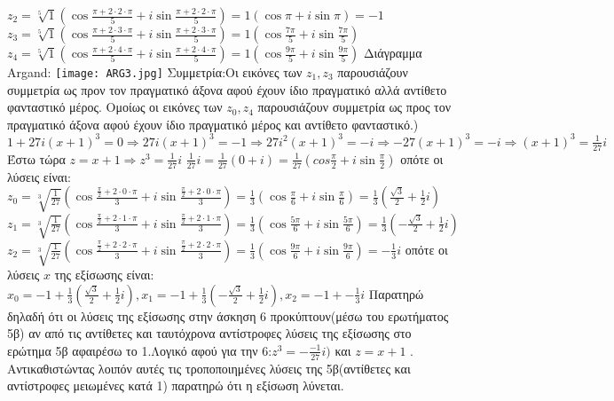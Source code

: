 \documentclass{article}
\begin{document}
$z_2=\sqrt[5]{1}(\cos{\frac{\pi+2\cdot2\cdot\pi}{5}}+i\sin{\frac{\pi+2\cdot2\cdot\pi}{5}})=1(\cos\pi+i\sin\pi)=-1$ \newline
$z_3=\sqrt[5]{1}(\cos{\frac{\pi+2\cdot3\cdot\pi}{5}}+i\sin{\frac{\pi+2\cdot3\cdot\pi}{5}})=1(\cos{\frac{7\pi}{5}}+i\sin{\frac{7\pi}{5}})$ \newline
$z_4=\sqrt[5]{1}(\cos{\frac{\pi+2\cdot4\cdot\pi}{5}}+i\sin{\frac{\pi+2\cdot4\cdot\pi}{5}})=1(\cos{\frac{9\pi}{5}}+i\sin{\frac{9\pi}{5}})$
Διάγραμμα Argand:\newline
\texttt{[image: ARG3.jpg]} \newline
Συμμετρία:Οι εικόνες των $z_1,z_3$ παρουσιάζουν συμμετρία ως προν τον πραγματικό άξονα αφού έχουν ίδιο πραγματικό αλλά αντίθετο φανταστικό μέρος. Ομοίως οι εικόνες των $z_0,z_4$ παρουσιάζουν συμμετρία ως προς τον πραγματικό άξονα αφού έχουν ίδιο πραγματικό μέρος και αντίθετο φανταστικό.)
$1+27i{(x+1)}^3=0 \Rightarrow 27i{(x+1)}^3=-1 \Rightarrow 27i^2{(x+1)}^3=-i \Rightarrow -27{(x+1)}^3=-i \Rightarrow {(x+1)}^3=\frac{1}{27}i $ \newline
Έστω τώρα $z=x+1 \Rightarrow z^3=\frac{1}{27}i$ \newline
$\frac{1}{27}i=\frac{1}{27}(0+i)=\frac{1}{27}(cos{\frac{\pi}{2}}+i\sin{\frac{\pi}{2}})$ οπότε οι λύσεις είναι:\newline
$z_0=\sqrt[3]{\frac{1}{27}}(\cos{\frac{\frac{\pi}{2}+2\cdot0\cdot\pi}{3}}+i\sin{\frac{\frac{\pi}{2}+2\cdot0\cdot\pi}{3}})=\frac{1}{3}(\cos{\frac{\pi}{6}}+i\sin{\frac{\pi}{6}})=\frac{1}{3}(\frac{\sqrt3}{2}+\frac{1}{2}i)$\newline
$z_1=\sqrt[3]{\frac{1}{27}}(\cos{\frac{\frac{\pi}{2}+2\cdot1\cdot\pi}{3}}+i\sin{\frac{\frac{\pi}{2}+2\cdot1\cdot\pi}{3}})=\frac{1}{3}(\cos{\frac{5\pi}{6}}+i\sin{\frac{5\pi}{6}})=\frac{1}{3}(-\frac{\sqrt3}{2}+\frac{1}{2}i)$ \newline
$z_2=\sqrt[3]{\frac{1}{27}}(\cos{\frac{\frac{\pi}{2}+2\cdot2\cdot\pi}{3}}+i\sin{\frac{\frac{\pi}{2}+2\cdot2\cdot\pi}{3}})=\frac{1}{3}(\cos{\frac{9\pi}{6}}+i\sin{\frac{9\pi}{6}})=-\frac{1}{3}i$ οπότε οι λύσεις $x$ της εξίσωσης είναι:\newline
$x_0=-1+\frac{1}{3}(\frac{\sqrt3}{2}+\frac{1}{2}i) , x_1=-1+\frac{1}{3}(-\frac{\sqrt3}{2}+\frac{1}{2}i) , x_2=-1+-\frac{1}{3}i$ \newline
Παρατηρώ δηλαδή ότι οι λύσεις της εξίσωσης στην άσκηση 6 προκύπτουν(μέσω του ερωτήματος 5β) αν από τις αντίθετες και ταυτόχρονα αντίστροφες λύσεις της εξίσωσης στο ερώτημα 5β αφαιρέσω το 1.Λογικό αφού για την 6:$z^3=-\frac{-1}{27}i)$ και $z=x+1$ . Αντικαθιστώντας λοιπόν αυτές τις τροποποιημένες λύσεις της 5β(αντίθετες και αντίστροφες μειωμένες κατά 1) παρατηρώ ότι η εξίσωση λύνεται.\newline
\end{document}
